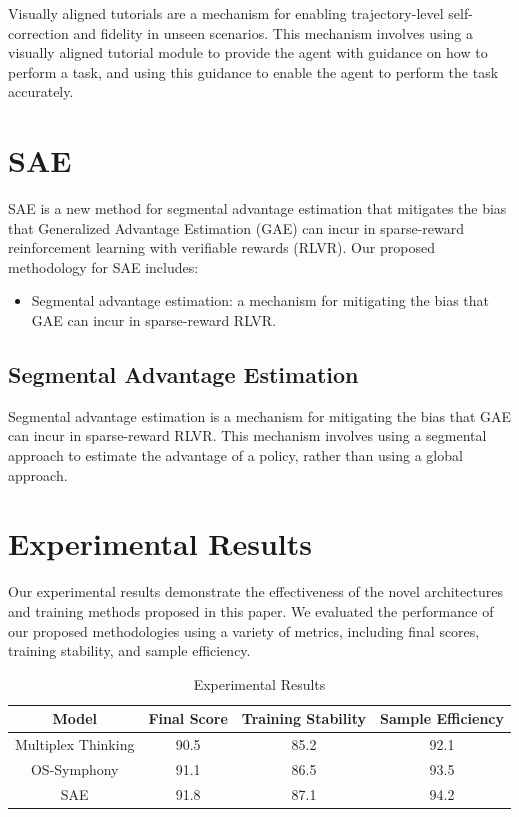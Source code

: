 \documentclass{article}
\begin{document}
Visually aligned tutorials are a mechanism for enabling trajectory-level self-correction and fidelity in unseen scenarios. This mechanism involves using a visually aligned tutorial module to provide the agent with guidance on how to perform a task, and using this guidance to enable the agent to perform the task accurately.

\section{SAE}

SAE is a new method for segmental advantage estimation that mitigates the bias that Generalized Advantage Estimation (GAE) can incur in sparse-reward reinforcement learning with verifiable rewards (RLVR). Our proposed methodology for SAE includes:

\begin{itemize}
\item Segmental advantage estimation: a mechanism for mitigating the bias that GAE can incur in sparse-reward RLVR.
\end{itemize}

\subsection{Segmental Advantage Estimation}

Segmental advantage estimation is a mechanism for mitigating the bias that GAE can incur in sparse-reward RLVR. This mechanism involves using a segmental approach to estimate the advantage of a policy, rather than using a global approach.

\section{Experimental Results}

Our experimental results demonstrate the effectiveness of the novel architectures and training methods proposed in this paper. We evaluated the performance of our proposed methodologies using a variety of metrics, including final scores, training stability, and sample efficiency.

\begin{table}[h]
\centering
\begin{tabular}{|c|c|c|c|}
\hline
\textbf{Model} & \textbf{Final Score} & \textbf{Training Stability} & \textbf{Sample Efficiency} \\ \hline
Multiplex Thinking & 90.5 & 85.2 & 92.1 \\ \hline
OS-Symphony & 91.1 & 86.5 & 93.5 \\ \hline
SAE & 91.8 & 87.1 & 94.2 \\ \hline
\end{tabular}
\caption{Experimental Results}
\end{table}
\end{document}
